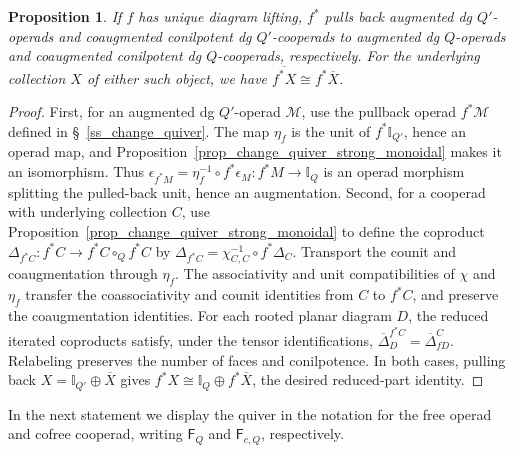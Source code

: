\documentclass[11pt,letterpaper]{article}
\numberwithin{equation}{section}
\theoremstyle{plain}
\newtheorem{prop}[thm]{Proposition}
\theoremstyle{definition}
\theoremstyle{remark}
\begin{document}
\begin{prop}\label{prop_change_quiver_augmented_pullback}
If $f$ has unique diagram lifting, $f^*$ pulls back augmented dg
$Q'$-operads and coaugmented conilpotent dg $Q'$-cooperads to
augmented dg $Q$-operads and coaugmented conilpotent dg $Q$-cooperads,
respectively. For the underlying collection $X$
of either such object, we have
$\overline{f^*X}\cong f^*\overline X$.
\end{prop}
\begin{proof}
First, for an augmented dg $Q'$-operad $\mathscr M$, use the pullback
operad $f^*\mathscr M$ defined in \S~\ref{ss_change_quiver}.
The map $\eta_f$ is the unit of $f^*\mathbb I_{Q'}$, hence an
operad map, and Proposition~\ref{prop_change_quiver_strong_monoidal}
makes it an isomorphism. Thus
$\epsilon_{f^*M}=\eta_f^{-1}\circ f^*\epsilon_M:
f^*M\to\mathbb I_Q$
is an operad morphism splitting the pulled-back unit, hence an augmentation.
Second, for a cooperad with underlying collection $C$, use
Proposition~\ref{prop_change_quiver_strong_monoidal} to define the coproduct
$\Delta_{f^*C}:f^*C\to f^*C\circ_Q f^*C$ by
$\Delta_{f^*C}=\chi_{C,C}^{-1}\circ f^*\Delta_C$.
Transport the counit and coaugmentation through $\eta_f$. The associativity and unit compatibilities of \(\chi\) and \(\eta_f\) transfer the coassociativity and counit identities from \(C\) to \(f^*C\), and preserve the coaugmentation identities.
For each rooted planar diagram $D$, the reduced iterated
coproducts satisfy, under the tensor identifications,
$ \overline\Delta_D^{f^*C}=\overline\Delta_{fD}^{C}$.
Relabeling preserves the number of faces and conilpotence.
In both cases, pulling back $X=\mathbb I_{Q'}\oplus\overline X$
gives $f^*X\cong\mathbb I_Q\oplus f^*\overline X$, the desired
reduced-part identity.
\end{proof}

In the next statement we display the quiver in the notation for
the free operad and cofree cooperad, writing $\mathsf F_Q$ and
$\mathsf F_{c,Q}$, respectively.
\end{document}
